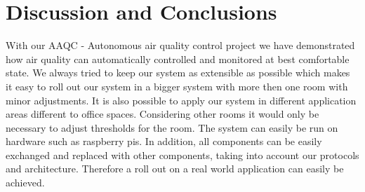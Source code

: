 \section{Discussion and Conclusions}\label{sec:discussion-and-conclusions}

With our AAQC - Autonomous air quality control project we have
demonstrated how air quality can automatically controlled and monitored
at best comfortable state.
We always tried to keep our system as
extensible as possible which makes it easy to roll out our system in a
bigger system with more then one room with minor adjustments.
It is also
possible to apply our system in different application areas different to
office spaces.
Considering other rooms it would only be necessary to
adjust thresholds for the room.
The system can easily be run on hardware
such as raspberry pis.
In addition, all components can be easily
exchanged and replaced with other components, taking into account our
protocols and architecture.
Therefore a roll out on a real world
application can easily be achieved.